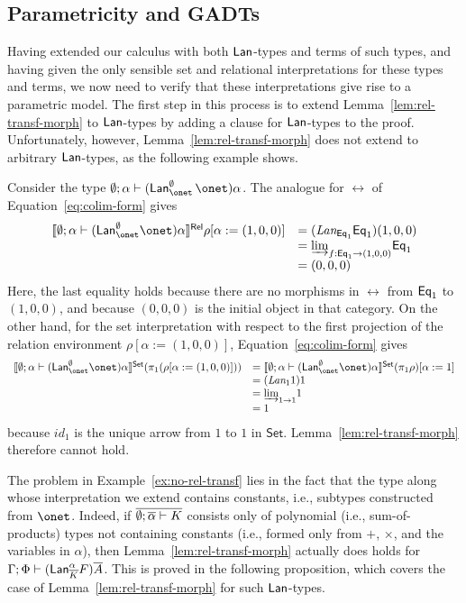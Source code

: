 \documentclass{lmcs}
\theoremstyle{plain}\newtheorem{satz}[thm]{Satz}
\newcommand{\set}{\mathsf{Set}}
\renewcommand{\id}{\mathit{id}}
\begin{document}
{\subsection{Parametricity and GADTs}

Having extended our calculus with both $\mathsf{Lan}$-types and terms of such
types, and having given the only sensible set and relational
interpretations for these types and terms, we now need to verify that
these interpretations give rise to a parametric model. The first step
in this process is to extend Lemma~\ref{lem:rel-transf-morph} to
$\mathsf{Lan}$-types by adding a clause for $\mathsf{Lan}$-types to the proof.
Unfortunately, however, Lemma~\ref{lem:rel-transf-morph} does not
extend to arbitrary $\mathsf{Lan}$-types, as the following example shows.

\begin{exa}\label{ex:no-rel-transf}
Consider the type $\emptyset; \alpha \vdash
(\Lan^{\emptyset}_{\onet}\, \onet) \alpha$. The analogue for $\rel$ of
Equation~\ref{eq:colim-form} gives
\[
\begin{array}{rl}
\relsem{ \emptyset; \alpha \vdash (\Lan^{\emptyset}_{\onet} \onet)
  \alpha } \rho [\alpha := (1, 0, 0)] 
&= (\textit{Lan}_{\Eq_1} \Eq_1)(1, 0, 0) \\
&= \colim{f : \Eq_1 \to (1, 0, 0)}{\Eq_1} \\
&= (0, 0, 0)
\end{array}
\]
Here, the last equality holds because there are no morphisms in $\rel$
from $\mathsf{Eq}_1$ to $(1, 0, 0)$, and because $(0,0,0)$ is the initial
object in that category. On the other hand, for the set interpretation
with respect to the first projection of the relation environment
$\rho[\alpha := (1,0,0)]$, Equation~\ref{eq:colim-form} gives
\[
\begin{array}{rl}
\setsem{ \emptyset; \alpha \vdash (\Lan^{\emptyset}_{\onet} \onet)
  \alpha } ( \pi_1 ( \rho [\alpha := (1, 0, 0)] ) ) 
&= \setsem{ \emptyset; \alpha \vdash (\Lan^{\emptyset}_{\onet} \onet)
  \alpha } (\pi_1 \rho) [\alpha := 1] \\ 
&= (\textit{Lan}_{1} 1) 1 \\
&= \colim{1 \to 1}{1} \\
&= 1
\end{array}
\]
because $\id_1$ is the unique arrow from $1$ to $1$ in $\set$.
Lemma~\ref{lem:rel-transf-morph} therefore cannot hold.
\end{exa}

The problem in Example~\ref{ex:no-rel-transf} lies in the fact that
the type along whose interpretation we extend contains constants, i.e.,
subtypes constructed from $\onet$. Indeed, if $\overline{\emptyset;
  \overline{\alpha} \vdash K}$ consists only of polynomial (i.e.,
sum-of-products) types not containing constants (i.e., formed only
from $+$, $\times$, and the variables in $\alpha$), then
Lemma~\ref{lem:rel-transf-morph} actually does holds for $\Gamma; \Phi
\vdash (\mathsf{Lan}^{\alpha}_{\overline{K}} F)\overline{A}$. This is proved in the
following proposition, which covers the case of
Lemma~\ref{lem:rel-transf-morph} for such $\mathsf{Lan}$-types.

}
\end{document}
